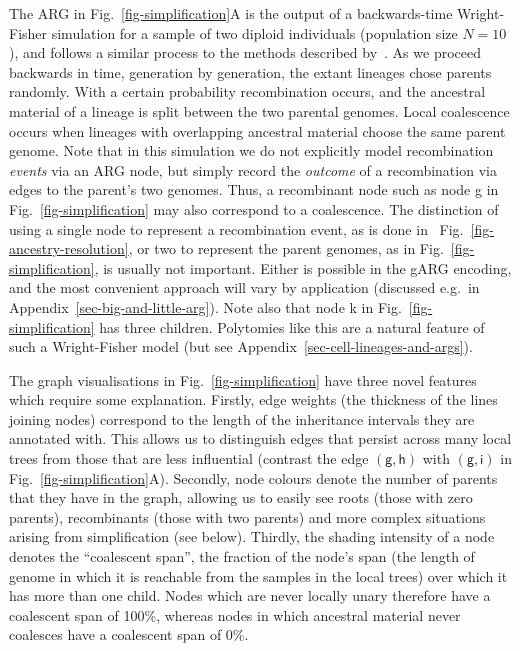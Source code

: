 \documentclass{article}
\newcommand{\noderef}[1]{\textsf{#1}}
\begin{document}
The ARG in Fig.~\ref{fig-simplification}A is the output of a
backwards-time Wright-Fisher simulation for a sample of two diploid
individuals (population size $N=10$), and follows a similar process
to the methods described by~\cite{nelson2020accounting}.
As we proceed backwards in time, generation by generation, the
extant lineages chose parents randomly.
With a certain probability recombination occurs, and the ancestral
material of a lineage is split between the two parental
genomes. Local coalescence occurs
when lineages with overlapping ancestral material choose the same
parent genome.
Note that in this simulation we do not explicitly
model recombination \emph{events} via an ARG node, but simply record
the \emph{outcome} of a recombination via edges to
the parent's two genomes.
Thus, a recombinant node such as node \noderef{g} in Fig.~\ref{fig-simplification}
may also correspond to a coalescence.
The distinction of
using a single node to represent
a recombination event, as is done in ~Fig.~\ref{fig-ancestry-resolution},
or two to represent the parent genomes, as in Fig.~\ref{fig-simplification},  is usually not important.
Either is possible in the gARG encoding, and the most convenient approach will vary by application
(discussed e.g.\ in Appendix~\ref{sec-big-and-little-arg}).
Note also that node \noderef{k} in Fig.~\ref{fig-simplification} has three children.
Polytomies like this are a natural feature of such a Wright-Fisher model
(but see Appendix~\ref{sec-cell-lineages-and-args}).

The graph visualisations in Fig.~\ref{fig-simplification} have
three novel features which require some explanation.
Firstly, edge weights (the thickness of the lines joining
nodes) correspond to the length of the inheritance intervals
they are annotated with. This allows us to distinguish
edges that persist across many local trees from those that are
less influential (contrast the edge
$(\noderef{g}, \noderef{h})$
with $(\noderef{g}, \noderef{i})$
in Fig.~\ref{fig-simplification}A).
Secondly, node colours denote the number of parents that they
have in the graph, allowing us to easily see roots (those
with zero parents), recombinants (those with two parents)
and more complex situations arising from simplification (see below).
Thirdly, the shading intensity of a node denotes the ``coalescent span'', the
fraction of the node's span (the length of genome in which it
is reachable from the samples in the local trees)
over which it has more than one child. Nodes which
are never locally unary therefore have a coalescent span of 100\%,
whereas nodes in which ancestral material never coalesces have a
coalescent span of 0\%.
\end{document}
